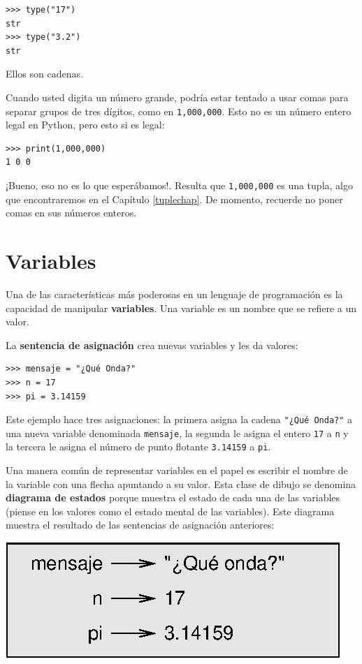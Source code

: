 \begin{verbatim}
>>> type("17")
str
>>> type("3.2")
str
\end{verbatim}

Ellos son cadenas.

Cuando usted digita un número grande, podría estar tentado a usar
comas para separar grupos de tres dígitos, como en \texttt{1,000,000}.
Esto no es un número entero legal en Python, pero esto si es legal:

\begin{verbatim}
>>> print(1,000,000)
1 0 0
\end{verbatim}

¡Bueno, eso no es lo que esperábamos!. Resulta que \texttt{1,000,000}
es una tupla, algo que encontraremos en el Capítulo \ref{tuplechap}.
De momento, recuerde no poner comas en sus números enteros.

\section{Variables}

  

Una de las características más poderosas en un lenguaje de programación
es la capacidad de manipular \textbf{variables}. Una variable es un
nombre que se refiere a un valor.

La \textbf{sentencia de asignación} crea nuevas variables y les da
valores:

\begin{verbatim}
>>> mensaje = "¿Qué Onda?"
>>> n = 17
>>> pi = 3.14159
\end{verbatim}

Este ejemplo hace tres asignaciones: la primera asigna la cadena {\verb+"¿Qué Onda?"+}
a una nueva variable denominada \texttt{mensaje}, la segunda le asigna
el entero \texttt{17} a \texttt{n} y la tercera le asigna el número
de punto flotante \texttt{3.14159} a \texttt{pi}.


Una manera común de representar variables en el papel es escribir
el nombre de la variable con una flecha apuntando a su valor. Esta
clase de dibujo se denomina \textbf{diagrama de estados} porque muestra
el estado de cada una de las variables (piense en los valores como
el estado mental de las variables). Este diagrama muestra el resultado
de las sentencias de asignación anteriores:

\beforefig \centerline{\includegraphics{illustrations/state2}}
\afterfig

